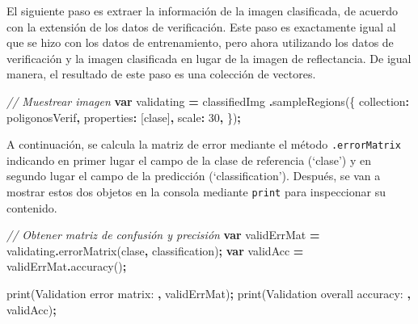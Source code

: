 \documentclass[
  12pt,
  letterpaper,
  twoside]{book}
\newenvironment{Shaded}{\begin{snugshade}}{\end{snugshade}}
\newcommand{\CommentTok}[1]{\textcolor[rgb]{0.56,0.35,0.01}{\textit{#1}}}
\newcommand{\DataTypeTok}[1]{\textcolor[rgb]{0.13,0.29,0.53}{#1}}
\newcommand{\DecValTok}[1]{\textcolor[rgb]{0.00,0.00,0.81}{#1}}
\newcommand{\FunctionTok}[1]{\textcolor[rgb]{0.00,0.00,0.00}{#1}}
\newcommand{\KeywordTok}[1]{\textcolor[rgb]{0.13,0.29,0.53}{\textbf{#1}}}
\newcommand{\NormalTok}[1]{#1}
\newcommand{\OperatorTok}[1]{\textcolor[rgb]{0.81,0.36,0.00}{\textbf{#1}}}
\newcommand{\StringTok}[1]{\textcolor[rgb]{0.31,0.60,0.02}{#1}}
\begin{document}
El siguiente paso es extraer la información de la imagen clasificada, de acuerdo con la extensión de los datos de verificación. Este paso es exactamente igual al que se hizo con los datos de entrenamiento, pero ahora utilizando los datos de verificación y la imagen clasificada en lugar de la imagen de reflectancia. De igual manera, el resultado de este paso es una colección de vectores.

\begin{Shaded}
\begin{Highlighting}[]
\CommentTok{// Muestrear imagen}
\KeywordTok{var}\NormalTok{ validating }\OperatorTok{=}\NormalTok{ classifiedImg}
  \OperatorTok{.}\FunctionTok{sampleRegions}\NormalTok{(\{}
  \DataTypeTok{collection}\OperatorTok{:}\NormalTok{ poligonosVerif}\OperatorTok{,}
  \DataTypeTok{properties}\OperatorTok{:}\NormalTok{ [}\StringTok{\textquotesingle{}clase\textquotesingle{}}\NormalTok{]}\OperatorTok{,}
  \DataTypeTok{scale}\OperatorTok{:} \DecValTok{30}\OperatorTok{,}
\NormalTok{\})}\OperatorTok{;}
\end{Highlighting}
\end{Shaded}

A continuación, se calcula la matriz de error mediante el método \texttt{.errorMatrix} indicando en primer lugar el campo de la clase de referencia (`clase') y en segundo lugar el campo de la predicción (`classification'). Después, se van a mostrar estos dos objetos en la consola mediante \texttt{print} para inspeccionar su contenido.

\begin{Shaded}
\begin{Highlighting}[]
\CommentTok{// Obtener matriz de confusión y precisión}
\KeywordTok{var}\NormalTok{ validErrMat }\OperatorTok{=}\NormalTok{ validating}\OperatorTok{.}\FunctionTok{errorMatrix}\NormalTok{(}\StringTok{\textquotesingle{}clase\textquotesingle{}}\OperatorTok{,} \StringTok{\textquotesingle{}classification\textquotesingle{}}\NormalTok{)}\OperatorTok{;}
\KeywordTok{var}\NormalTok{ validAcc }\OperatorTok{=}\NormalTok{ validErrMat}\OperatorTok{.}\FunctionTok{accuracy}\NormalTok{()}\OperatorTok{;}

\FunctionTok{print}\NormalTok{(}\StringTok{\textquotesingle{}Validation error matrix: \textquotesingle{}}\OperatorTok{,}\NormalTok{ validErrMat)}\OperatorTok{;}
\FunctionTok{print}\NormalTok{(}\StringTok{\textquotesingle{}Validation overall accuracy: \textquotesingle{}}\OperatorTok{,}\NormalTok{ validAcc)}\OperatorTok{;}
\end{Highlighting}
\end{Shaded}
\end{document}
